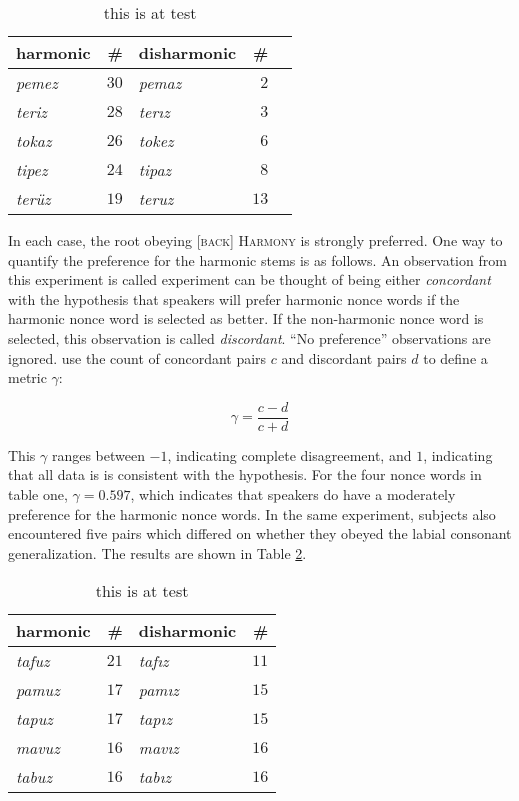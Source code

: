 \begin{table}
\centering
\begin{tabular}{l r l r r}
\toprule
harmonic      & \#   & disharmonic & \#   \\
\midrule
\emph{pemez}  & $30$  & \emph{pemaz}     & $2$  \\
\emph{teriz}   & $28$ & \emph{ter\i z}   & $3$  \\
\emph{tokaz}   & $26$ & \emph{tokez}     & $6$  \\
\emph{tipez}   & $24$ & \emph{tipaz}     & $8$  \\
\emph{ter\"uz} & $19$ & \emph{teruz}     & $13$ \\
\bottomrule
\end{tabular}
\caption{this is at test \citet[][314]{Zimmer1969}}
\label{backharm}
\end{table}

In each case, the root obeying [\textsc{back}] \textsc{Harmony} is strongly preferred. One way to quantify the preference for the harmonic stems is as follows. An observation from this experiment is called experiment can be thought of being either \emph{concordant} with the hypothesis that speakers will prefer harmonic nonce words if the harmonic nonce word is selected as better. If the non-harmonic nonce word is selected, this observation is called \emph{discordant}. ``No preference'' observations are ignored.  \citet[][749]{Goodman1954} use the count of concordant pairs $c$ and discordant pairs $d$ to define a metric $\gamma$:

\begin{equation}
\gamma = \frac{c - d}{c + d}
\end{equation}

This $\gamma$ ranges between $-1$, indicating complete disagreement, and $1$, indicating that all data is is consistent with the hypothesis. For the four nonce words in table one, $\gamma = 0.597$, which indicates that speakers do have a moderately preference for the harmonic nonce words. In the same experiment, subjects also encountered five pairs which differed on whether they obeyed the labial consonant generalization. The results are shown in Table \ref{labcons}.

\begin{table}
\centering
\begin{tabular}{l r l r}
\toprule
harmonic & \# & disharmonic & \# \\
\midrule
\emph{tafuz} & $21$ & \emph{taf\i z} & $11$ \\
\emph{pamuz} & $17$ & \emph{pam\i z} & $15$ \\
\emph{tapuz} & $17$ & \emph{tap\i z} & $15$ \\
\emph{mavuz} & $16$ & \emph{mav\i z} & $16$ \\
\emph{tabuz} & $16$ & \emph{tab\i z} & $16$ \\
\bottomrule
\end{tabular}
\caption{this is at test \citet[][314]{Zimmer1969}}
\label{labcons}
\end{table}


